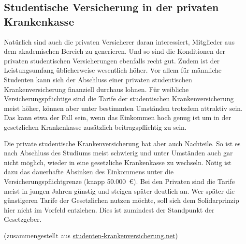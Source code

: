 \subsection*{Studentische Versicherung in der privaten Krankenkasse}

Natürlich sind auch die privaten Versicherer daran interessiert,
Mitglieder aus dem akademischen Bereich zu generieren. Und so sind die
Konditionen der privaten studentischen Versicherungen ebenfalls recht gut. Zudem ist der
Leistungsumfang üblicherweise wesentlich höher. Vor allem für
männliche Studenten kann sich der Abschluss einer privaten
studentischen Krankenversicherung finanziell durchaus lohnen. Für weibliche
Versicherungspflichtige sind die Tarife der
studentischen Krankenversicherung meist höher, können aber unter
bestimmten Umständen trotzdem attraktiv sein. Das kann etwa der Fall
sein, wenn das Einkommen hoch genug ist um in der gesetzlichen
Krankenkasse zusätzlich beitragspflichtig zu sein.

Die private studentische Krankenversicherung hat aber auch Nachteile. So ist es nach
Abschluss des Studiums meist schwierig und unter Umständen auch gar
nicht möglich, wieder in eine gesetzliche Krankenkasse zu
wechseln. Nötig ist dazu das dauerhafte Absinken des Einkommens unter
die Versicherungspflichtgrenze (knapp 50.000~€). Bei den Privaten sind
die Tarife meist in jungen Jahren günstig und steigen später deutlich
an. Wer später die günstigeren Tarife der Gesetzlichen nutzen möchte,
soll sich dem Solidarprinzip hier nicht im Vorfeld entziehen. Dies ist
zumindest der Standpunkt der Gesetzgeber.

\footnotesize (zusammengestellt aus {\url{studenten-krankenversicherung.net}})
\normalsize
